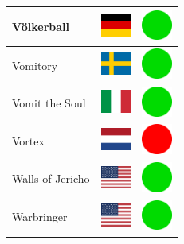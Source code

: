 \documentclass[12pt, a4paper, twoside]{report}
\begin{document}
\begin{center}
\begin{longtable}{|p{5cm}|p{2cm}|p{2cm}|}
			Völkerball & \includegraphics[width=1cm]{4x3/de} & \includegraphics[width=1cm]{likes/y} \\ \hline
			Vomitory & \includegraphics[width=1cm]{4x3/se} & \includegraphics[width=1cm]{likes/y} \\ \hline
			Vomit the Soul & \includegraphics[width=1cm]{4x3/it} & \includegraphics[width=1cm]{likes/y} \\ \hline
			Vortex & \includegraphics[width=1cm]{4x3/nl} & \includegraphics[width=1cm]{likes/n} \\ \hline
			Walls of Jericho & \includegraphics[width=1cm]{4x3/us} & \includegraphics[width=1cm]{likes/y} \\ \hline
			Warbringer & \includegraphics[width=1cm]{4x3/us} & \includegraphics[width=1cm]{likes/y} \\ \hline

\end{longtable}
\end{center}
\end{document}
